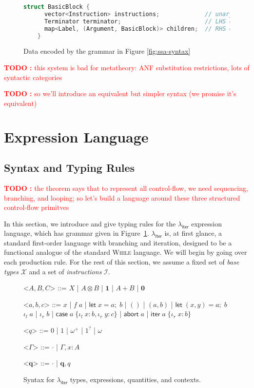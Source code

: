 \documentclass[acmsmall,screen,review]{acmart}
\newcounter{todos}
\newcommand{\TODO}[1]{{
  \stepcounter{todos}
  \begin{center}\large{\textcolor{red}{\textbf{TODO \arabic{todos}:} #1}}\end{center}
}}
\newcommand{\mc}[1]{\ensuremath{\mathcal{#1}}}
\newcommand{\mb}[1]{\ensuremath{\mathbf{#1}}}
\newcommand{\ms}[1]{\ensuremath{\mathsf{#1}}}
\newcommand{\lto}{:}
\newcommand{\linl}[1]{\iota_l\;{#1}}
\newcommand{\linr}[1]{\iota_r\;{#1}}
\newcommand{\labort}[1]{\ms{abort}\;{#1}}
\newcommand{\letexpr}[3]{\ensuremath{\ms{let}\;#1 = #2;\;#3}}
\newcommand{\caseexpr}[5]{\ms{case}\;#1\;\{\linl{#2} \lto #3, \linr{#4} \lto #5\}}
\newcommand{\liter}[3]{\ms{iter}\;#1\;\{ \linr{#2} \lto #3 \}}
\newcommand{\subiterexp}{\(\lambda_{\ms{iter}}\)}
\newcommand{\zeroq}{0}
\newcommand{\oneq}{1}
\newcommand{\delq}{1^?}
\newcommand{\cpyq}{\omega^+}
\newcommand{\topq}{\omega}
\begin{document}
\begin{figure}
  \begin{lstlisting}[language=C++]
    struct BasicBlock {
      vector<Instruction> instructions;             // unary/binary let-bindings
      Terminator terminator;                        // LHS of where-block
      map<Label, (Argument, BasicBlock)> children;  // RHS of where-block
    }
  \end{lstlisting}
  \caption{Data encoded by the grammar in Figure \ref{fig:ssa-syntax}}
  \Description{}
\end{figure}

\TODO{this system is bad for metatheory: ANF substitution restrictions, lots of syntactic
categories}

\TODO{so we'll introduce an equivalent but simpler syntax (we promise it's equivalent)}

\section{Expression Language}

\subsection{Syntax and Typing Rules}

\TODO{the \citet{bohm-jacopini} theorem says that to represent all control-flow, we need sequencing,
branching, and looping; so let's build a language around these three structured control-flow
primitves}

In this section, we introduce and give typing rules for the \subiterexp{} expression language, which
has grammar given in Figure~\ref{fig:expr-syntax}. \subiterexp{} is, at first glance, a
standard first-order language with branching and iteration, designed to be a functional analogue of
the standard \textsc{While} language. We will begin by going over each production rule. For the rest
of this section, we assume a fixed set of \emph{base types} $\mc{X}$ and a set of
\emph{instructions} $\mc{I}$. 

\begin{figure}
  \begin{grammar}
    <\(A, B, C\)> ::= 
    \(X\)
    \;|\; \(A \otimes B\)
    \;|\; \(\mathbf{1}\)
    \;|\; \(A + B\)
    \;|\; \(\mathbf{0}\)

    <\(a, b, c\)> ::=
    \(x\)
    \;|\; \(f\;a\)
    \;|\; \(\letexpr{x}{a}{b}\)
    \;|\; \(()\)
    \;|\; \((a, b)\)
    \;|\; \(\letexpr{(x, y)}{a}{b}\)
    \alt  \(\linl{a}\)
    \;|\; \(\linr{b}\)
    \;|\; \(\caseexpr{a}{x}{b}{y}{c}\)
    \;|\; \(\labort{a}\)
    \;|\; \(\liter{a}{x}{b}\)
    
    <\(q\)> ::= \(\zeroq\) | \(\oneq\) | \(\cpyq\) | \(\delq\) | \(\topq\)

    <\(\Gamma\)> ::= \(\cdot\) \;|\; \(\Gamma, x : A\)

    <\(\mb{q}\)> ::= \(\cdot\) \;|\; \(\mb{q}, q\)
  \end{grammar}
  \caption{Syntax for \subiterexp{} types, expressions, quantities, and contexts.} \Description{}
  \label{fig:expr-syntax}
\end{figure}
\end{document}
